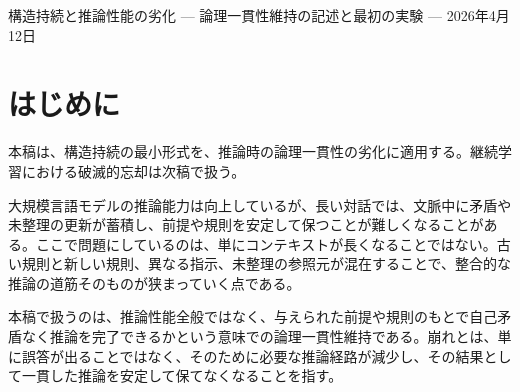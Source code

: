 \documentclass[12pt,a4paper]{article}
\begin{document}
\PaperTitleBlock
  {構造持続と推論性能の劣化}
  {— 論理一貫性維持の記述と最初の実験 —}
  {2026年4月12日}

\begin{abstract}
大規模言語モデルでは、対話が長くなるにつれて矛盾や未整理の更新が蓄積し、自己矛盾なく推論を完了することが難しくなることがある。本稿では、この劣化を「論理一貫性を保って最後まで到達できる推論経路の集合が、制約の蓄積によって縮小していく過程」として記述する。ここで扱うのは推論性能全般ではなく、与えられた前提や規則のもとで論理一貫性を維持できるかという、より限定された問題である。

対話実験では、外部代謝パイプラインを備えた条件（ON）が、備えない条件（OFF）に対して論理一貫性維持率を上回る方向が観測された。ここで ON とは、矛盾する更新を外部で検出し、「旧値 -\textgreater{} 新値」の時間ラベルつき対として整理・保持する条件である。OFF とは、同じ矛盾を注入するが、その整理を行わず、古い情報と新しい情報を未整理のまま混在させる条件である。gemma3:27b（\(n=3\)、ON/OFF/NC の三条件、180 ターン）では、規則＋事実の合算で ON 73.3\%、NC 56.7\%、OFF 21.1\% となった（\(ON vs OFF p = 0.0004\), \(d = 8.80\); \(ON vs NC p = 0.031\), \(d = 2.67\)）。qwen3.5:27b（\(n=1\)、ON/OFF、30 ターン、§8.3 の実装前提を満たす条件、ON の代謝 LLM は Claude Sonnet）でも、全体正答率は ON 64.4\%、OFF 44.4\% となり、同じ方向が確認された。加えて、100ターンの長期実験（qwen3.5:9b、代謝あり条件）では、論理一貫性は長期にわたって安定し、単調な崩壊は観測されなかった。
\end{abstract}

\section{はじめに}\label{ux306fux3058ux3081ux306b}

本稿は、構造持続の最小形式を、推論時の論理一貫性の劣化に適用する。継続学習における破滅的忘却は次稿で扱う。

大規模言語モデルの推論能力は向上しているが、長い対話では、文脈中に矛盾や未整理の更新が蓄積し、前提や規則を安定して保つことが難しくなることがある。ここで問題にしているのは、単にコンテキストが長くなることではない。古い規則と新しい規則、異なる指示、未整理の参照元が混在することで、整合的な推論の道筋そのものが狭まっていく点である。

本稿で扱うのは、推論性能全般ではなく、与えられた前提や規則のもとで自己矛盾なく推論を完了できるかという意味での論理一貫性維持である。崩れとは、単に誤答が出ることではなく、そのために必要な推論経路が減少し、その結果として一貫した推論を安定して保てなくなることを指す。
\end{document}
